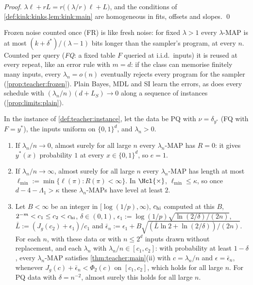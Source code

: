 \emph{Proof.} $\lambda\ell+rL=r\big((\lambda/r)\ell+L\big)$, and the conditions of \cref{def:kink:kinks,lem:kink:main} are homogeneous in fits, offsets and slopes. \qed

Frozen noise counted once (FR) is like fresh noise: for fixed $\lambda>1$ every $\lambda$-MAP is at most $(k+\delta^*)/(\lambda-1)$ bits longer than the sampler's program, at every $n$. Counted per query (\emph{FQ}: a fixed table $F$ queried at i.i.d.\ inputs) it is reused at every repeat, like an error rule with $m=d$: if the class can memorise finitely many inputs, every $\lambda_n=o(n)$ eventually rejects every program for the sampler (\cref{prop:teacher:frozen}). Plain Bayes, MDL and SI learn the errors, as does every schedule with $(\lambda_n/n)(d+L_S)\to0$ along a sequence of instances (\cref{prop:limits:plain}).

\begin{proposition}\label{prop:teacher:schedules}
In the instance of \cref{def:teacher:instance}, let the data be PQ with $\nu=\delta_{y^*}$ (FQ with $F=y^*$), the inputs uniform on $\{0,1\}^d$, and $\lambda_n>0$.
\begin{enumerate}[label=(\alph*),itemsep=0pt,topsep=2pt]
\item If $\lambda_n/n\to0$, almost surely for all large $n$ every $\lambda_n$-MAP has $R=0$: it gives $y^*(x)$ probability $1$ at every $x\in\{0,1\}^d$, so $e=1$.
\item If $\lambda_n/n\to\infty$, almost surely for all large $n$ every $\lambda_n$-MAP has length at most $\ell_{\min}:=\min\{\ell(\pi):R(\pi)<\infty\}$. In $\Hcl{\times}$, $\ell_{\min}\le\kappa$, so once $d-4-\Lambda_1>\kappa$ these $\lambda_n$-MAPs have level at least $2$.
\item Let $B<\infty$ be an integer in $[\log(1/p),\infty)$, $c_{\rm hi}$ computed at this $B$, $2^{-m}<c_1\le c_2<c_{\rm hi}$, $\delta\in(0,1)$, $\epsilon_1:=\log(1/p)\sqrt{\ln(2/\delta)/(2n)}$, $\bar L:=(J_g(c_2)+\epsilon_1)/c_1$ and $\bar\epsilon_n:=\epsilon_1+B\sqrt{(\bar L\ln2+\ln(2/\delta))/(2n)}$. For each $n$, with these data or with $n\le2^d$ inputs drawn without replacement, and each $\lambda_n$ with $\lambda_n/n\in[c_1,c_2]$: with probability at least $1-\delta$, every $\lambda_n$-MAP satisfies \cref{thm:teacher:main}(ii) with $c=\lambda_n/n$ and $\epsilon=\bar\epsilon_n$, whenever $J_g(c)+\bar\epsilon_n<\Phi_2(c)$ on $[c_1,c_2]$, which holds for all large $n$. For PQ data with $\delta=n^{-2}$, almost surely this holds for all large $n$.
\end{enumerate}
\end{proposition}

